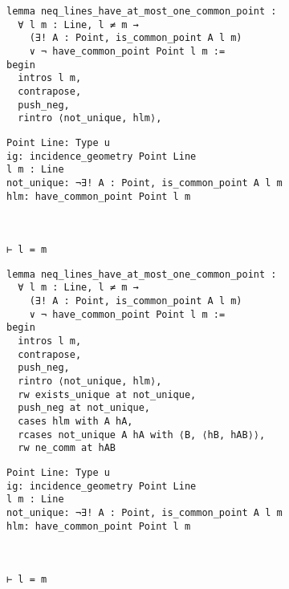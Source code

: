 \begin{frame}[fragile]
	\begin{multicols}{2}
		\begin{lstlisting}
lemma neq_lines_have_at_most_one_common_point :
  ∀ l m : Line, l ≠ m → 
    (∃! A : Point, is_common_point A l m) 
    ∨ ¬ have_common_point Point l m := 
begin
  intros l m,
  contrapose,
  push_neg,
  rintro ⟨not_unique, hlm⟩,
\end{lstlisting}
		\columnbreak
		\begin{lstlisting}
Point Line: Type u
ig: incidence_geometry Point Line
l m : Line
not_unique: ¬∃! A : Point, is_common_point A l m
hlm: have_common_point Point l m



⊢ l = m
		\end{lstlisting}
	\end{multicols}
\end{frame}










\begin{frame}[fragile]
	\begin{multicols}{2}
		\begin{lstlisting}
lemma neq_lines_have_at_most_one_common_point :
  ∀ l m : Line, l ≠ m → 
    (∃! A : Point, is_common_point A l m) 
    ∨ ¬ have_common_point Point l m := 
begin
  intros l m,
  contrapose,
  push_neg,
  rintro ⟨not_unique, hlm⟩,
  rw exists_unique at not_unique,
  push_neg at not_unique,
  cases hlm with A hA,
  rcases not_unique A hA with ⟨B, ⟨hB, hAB⟩⟩,
  rw ne_comm at hAB
\end{lstlisting}
		\columnbreak
		\begin{lstlisting}
Point Line: Type u
ig: incidence_geometry Point Line
l m : Line
not_unique: ¬∃! A : Point, is_common_point A l m
hlm: have_common_point Point l m



⊢ l = m
\end{lstlisting}
	\end{multicols}
\end{frame}










